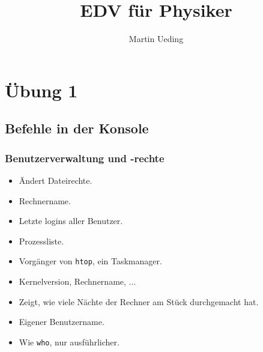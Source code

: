 \documentclass[12pt]{article}
\title{EDV für Physiker}
\author{Martin Ueding}
\newcommand\dd[2]{\item[\texttt{#1}] #2}
\begin{document}
\maketitle

\tableofcontents
\newpage



\section{Übung 1}

\subsection{Befehle in der Konsole}
\label{commands}

\subsubsection{Benutzerverwaltung und -rechte}
\begin{itemize}
\dd{chmod}{Ändert Dateirechte.}
\dd{hostname}{Rechnername.}
\dd{last}{Letzte logins aller Benutzer.}
\dd{ps}{Prozessliste.}
\dd{top}{Vorgänger von \texttt{htop}, ein Taskmanager.}
\dd{uname}{Kernelversion, Rechnername, ...}
\dd{uptime}{Zeigt, wie viele Nächte der Rechner am Stück durchgemacht hat.}
\dd{whoami}{Eigener Benutzername.}
\dd{w}{Wie \texttt{who}, nur ausführlicher.}
\end{itemize}
\end{document}
